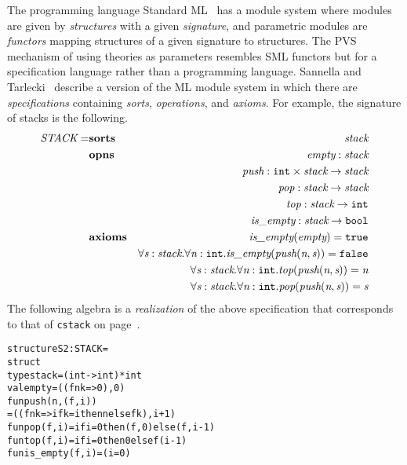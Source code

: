 \documentclass[11pt,twoside,openright,titlepage]{cslreport}
\begin{document}
The programming language Standard ML~\cite{ML-report} has a module
system where modules are given by \emph{structures} with a given
\emph{signature}, and parametric modules are \emph{functors} mapping
structures of a given signature to structures.  The PVS mechanism
of using theories as parameters resembles SML functors but for a
specification language rather than a programming language. 
Sannella and Tarlecki~\cite{SannellaDT:essential-concepts97} describe a
version of the ML module system in which there are \emph{specifications}
containing \emph{sorts}, \emph{operations}, and \emph{axioms}.  For
example, the signature of stacks is the following.
\begin{eqnarray*}
\emph{STACK} = & \textbf{sorts} & \emph{stack} \\
               & \textbf{opns} & \emph{empty} : \emph{stack} \\
               &               & \emph{push} : \texttt{int} \times \emph{stack} \rightarrow \emph{stack} \\
               &               & \emph{pop} :
                                 \emph{stack} \rightarrow \emph{stack} \\
               &               & \emph{top} :
                                 \emph{stack} \rightarrow \texttt{int} \\
               &               & \emph{is\_empty} :
                                 \emph{stack} \rightarrow \texttt{bool} \\
               & \textbf{axioms} & \emph{is\_empty}(\emph{empty}) =
                                   \texttt{true} \\
               &               &
               \forall\emph{s}:\emph{stack}.\forall\emph{n}:\texttt{int}.
                 \emph{is\_empty}(\emph{push}(\emph{n},\emph{s}))
                     = \texttt{false} \\
               &               &
               \forall\emph{s}:\emph{stack}.\forall\emph{n}:\texttt{int}.
                 \emph{top}(\emph{push}(\emph{n},\emph{s})) = \emph{n} \\
               &               &
               \forall\emph{s}:\emph{stack}.\forall\emph{n}:\texttt{int}.
                 \emph{pop}(\emph{push}(\emph{n},\emph{s})) = \emph{s} \\
\end{eqnarray*}
The following algebra is a \emph{realization} of the above specification
that corresponds to that of \texttt{cstack} on page~\pageref{cstack}.
{\smaller\begin{alltt}
  structure S2 : STACK =
      struct
          type stack = (int -> int) * int
          val empty = ((fn k => 0), 0)
          fun push (n, (f, i))
                = ((fn k => if k = i then n else f k), i+1)
          fun pop (f, i) = if i = 0 then (f, 0) else (f, i-1)
          fun top (f, i) = if i = 0 then 0 else f(i-1)
          fun is_empty (f, i) = (i=0)
\end{alltt}}
\end{document}

